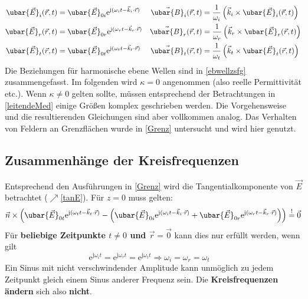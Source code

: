 		        \begin{align}
			        \ubar{\vec{E}}_i(\vec{r} , t) & = \ubar{\vec{E}}_{0i}  \mathrm{e}^{\mathrm{j}(\omega_i t - \vec{k}_i \cdot \vec{r} )} & \vec{\ubar{B}}_i(\vec{r} , t) & = \frac{1}{\omega_i} \left(\vec{k}_i \times \ubar{\vec{E}}_i(\vec{r} , t)\right) \\
			        \ubar{\vec{E}}_r(\vec{r} , t) & = \ubar{\vec{E}}_{0r}  \mathrm{e}^{\mathrm{j}(\omega_r t - \vec{k}_r \cdot \vec{r} )} & \vec{\ubar{B}}_r(\vec{r} , t) & = \frac{1}{\omega_r} \left(\vec{k}_r \times \ubar{\vec{E}}_r(\vec{r} , t)\right) \\
			        \ubar{\vec{E}}_t(\vec{r} , t) & = \ubar{\vec{E}}_{0t}  \mathrm{e}^{\mathrm{j}(\omega_t t - \vec{k}_t \cdot \vec{r} )} & \vec{\ubar{B}}_t(\vec{r} , t) & = \frac{1}{\omega_t} \left(\vec{k}_t \times \ubar{\vec{E}}_t(\vec{r} , t)\right)
		        \end{align} 
Die Beziehungen für harmonische ebene Wellen sind in \ref{ebwellzsfg} zusammengefasst. Im folgenden wird $\kappa=0$ angenommen (also reelle Permittivität etc.). Wenn $\kappa\neq 0$ gelten sollte, müssen entsprechend der Betrachtungen in \ref{leitendeMed} einige Größen komplex geschrieben werden. Die Vorgehensweise und die resultierenden Gleichungen sind aber vollkommen analog. Das Verhalten von Feldern an Grenzflächen wurde in \ref{Grenz} untersucht und wird hier genutzt.
\subsection{Zusammenhänge der Kreisfrequenzen}
  Entsprechend den Ausführungen in \ref{Grenz} wird die Tangentialkomponente von \(\vec{E}\) betrachtet ($\nearrow$\ref{tanE}). Für \(z=0\) muss gelten:
		        \begin{equation}\label{tanEwellen}
			        \vec{n} \times \left( \ubar{\vec{E}}_{0t}  \mathrm{e}^{\mathrm{j}(\omega_t t - \vec{k}_t \cdot \vec{r} )} -\left( \ubar{\vec{E}}_{0i}  \mathrm{e}^{\mathrm{j}(\omega_i t - \vec{k}_i \cdot \vec{r} )} + \ubar{\vec{E}}_{0r}  \mathrm{e}^{\mathrm{j}(\omega_r t - \vec{k}_r \cdot \vec{r} )}\right)\right) \stackrel{!}{=} \vec{0}
		        \end{equation}
 Für \textbf{beliebige Zeitpunkte \(t \ne 0\) und \(\vec{r}  = \vec{0}\)} kann dies nur erfüllt werden, wenn gilt
		        \begin{equation}
			        \mathrm{e}^{\mathrm{j}\omega_i t} =  \mathrm{e}^{\mathrm{j}\omega_r t} = \mathrm{e}^{\mathrm{j}\omega_t t} \Rightarrow \boxed{\omega_i =\omega_r = \omega_t} \quad 
		        \end{equation}
		       Ein Sinus mit nicht verschwindender Amplitude kann unmöglich zu jedem Zeitpunkt gleich einem Sinus anderer Frequenz sein. Die \textbf{Kreisfrequenzen} \textbf{ändern} sich also \textbf{nicht}.
